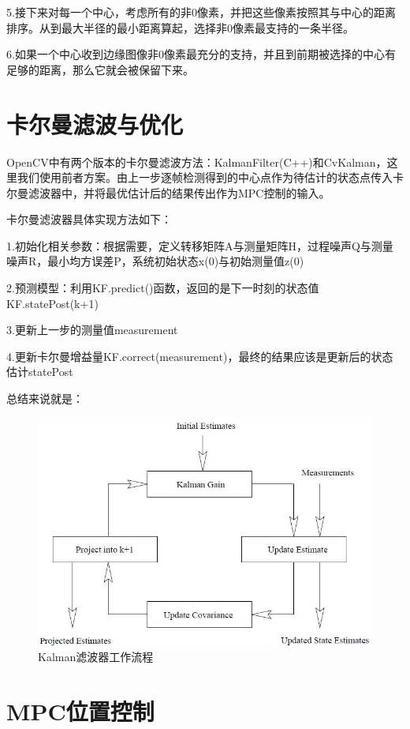 5.接下来对每⼀个中心，考虑所有的非0像素，并把这些像素按照其与中心的距离排序。从到最大半径的最小距离算起，选择非0像素最支持的⼀条半径。

6.如果⼀个中心收到边缘图像⾮0像素最充分的支持，并且到前期被选择的中心有足够的距离，那么它就会被保留下来。

\section{卡尔曼滤波与优化}

OpenCV中有两个版本的卡尔曼滤波方法：KalmanFilter(C++)和CvKalman，这里我们使用前者方案。由上一步逐帧检测得到的中心点作为待估计的状态点传入卡尔曼滤波器中，并将最优估计后的结果传出作为MPC控制的输入。

卡尔曼滤波器具体实现方法如下：

1.初始化相关参数：根据需要，定义转移矩阵A与测量矩阵H，过程噪声Q与测量噪声R，最小均方误差P，系统初始状态x(0)与初始测量值z(0)

2.预测模型：利用KF.predict()函数，返回的是下一时刻的状态值KF.statePost(k+1)

3.更新上一步的测量值measurement

4.更新卡尔曼增益量KF.correct(measurement)，最终的结果应该是更新后的状态估计statePost

总结来说就是：

\begin{figure}[ht]
  \centering
  \includegraphics[width=0.8\linewidth]{./Figure/Kalman_Filter_Code_Process.jpeg}
  \caption{Kalman滤波器工作流程}\label{Fig:xd1}
\end{figure}

\section{MPC位置控制}

